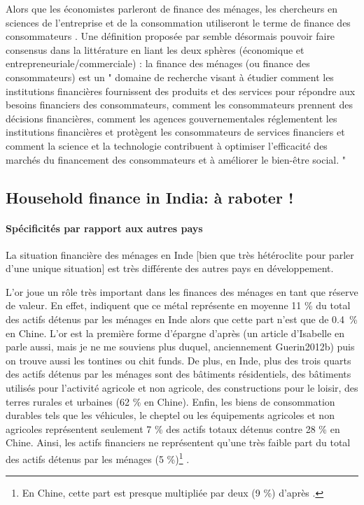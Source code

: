 \documentclass[a4paper, 11pt, onecolumn]{article}
\begin{document}
Alors que les économistes parleront de finance des ménages, les chercheurs en sciences de l'entreprise et de la consommation utiliseront le terme de finance des consommateurs \citep{Xiao2020}.
Une définition proposée par \cite{Xiao2020} semble désormais pouvoir faire consensus dans la littérature en liant les deux sphères (économique et entrepreneuriale/commerciale) : la finance des ménages (ou finance des consommateurs) est un " domaine de recherche visant à étudier comment les institutions financières fournissent des produits et des services pour répondre aux besoins financiers des consommateurs, comment les consommateurs prennent des décisions financières, comment les agences gouvernementales réglementent les institutions financières et protègent les consommateurs de services financiers et comment la science et la technologie contribuent à optimiser l'efficacité des marchés du financement des consommateurs et à améliorer le bien-être social. "


\subsection{Household finance in India: à raboter !}

 \paragraph{Spécificités par rapport aux autres pays}
 La situation financière des ménages en Inde [bien que très hétéroclite pour parler d'une unique situation] est très différente des autres pays en développement.

 L'or joue un rôle très important dans les finances des ménages en tant que réserve de valeur.
 En effet, \cite{Badarinza2016b} indiquent que ce métal représente en moyenne 11 \% du total des actifs détenus par les ménages en Inde alors que cette part n'est que de 0.4~\% en Chine.
  L'or est la première forme d'épargne d'après \cite{Roesch2008} (un article d'Isabelle en parle aussi, mais je ne me souviens plus duquel, anciennement Guerin2012b) puis on trouve aussi les tontines ou chit funds.
 De plus, en Inde, plus des trois quarts des actifs détenus par les ménages sont des bâtiments résidentiels, des bâtiments utilisés pour l'activité agricole et non agricole, des constructions pour le loisir, des terres rurales et urbaines (62 \% en Chine).
 Enfin, les biens de consommation durables tels que les véhicules, le cheptel ou les équipements agricoles et non agricoles représentent seulement 7 \% des actifs totaux détenus contre 28 \% en Chine.
 Ainsi, les actifs financiers ne représentent qu'une très faible part du total des actifs détenus par les ménages (5 \%)\footnote{En Chine, cette part est presque multipliée par deux (9 \%) d'après \cite{Badarinza2016b}.} \citep{Badarinza2016b}.
\end{document}
